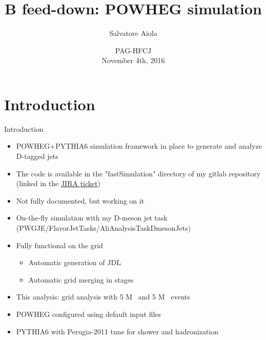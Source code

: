 \documentclass[xcolor={usenames,dvipsnames}]{beamer}
\title[B feed-down: POWHEG simulation] %
{B feed-down: POWHEG simulation}
\author[Salvatore Aiola]%
{Salvatore Aiola}
\institute[Yale University] %
{Yale University}
\date[PAG-HFCJ - Nov. 4th, 2016] %
{PAG-HFCJ \\
November 4th, 2016}
\begin{document}
\begin{frame}
  \titlepage
\end{frame}






\section{Introduction}

\begin{frame}{Introduction}
\begin{itemize}
\item POWHEG+PYTHIA6 simulation framework in place to generate and analyze D-tagged jets
\item The code is available in the "fastSimulation" directory of my gitlab repository (linked in the \href{https://alice.its.cern.ch/jira/browse/PWGHF-108}{JIRA ticket})
\item Not fully documented, but working on it
\item On-the-fly simulation with my D-meson jet task (PWGJE/FlavorJetTasks/AliAnalysisTaskDmesonJets)
\item Fully functional on the grid
\begin{itemize}
\item Automatic generation of JDL
\item Automatic grid merging in stages
\end{itemize}
\item This analysis: grid analysis with 5 M \ccbar\ and 5 M \bbbar\ events
\item POWHEG configured using default input files
\item PYTHIA6 with Perugia-2011 tune for shower and hadronization
\end{itemize}
\end{frame}
\end{document}
